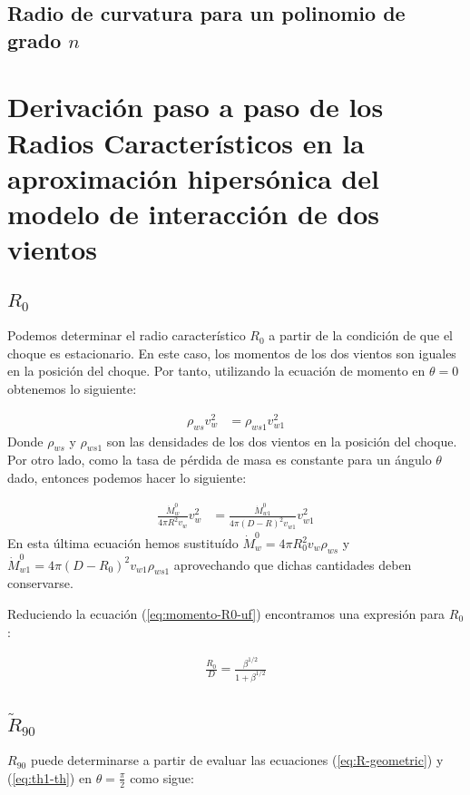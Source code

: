 \subsection{Radio de curvatura para un polinomio de grado $n$}
\label{app:curvature-radius-poly}

\section{Derivación paso a paso de los Radios Característicos en la aproximación
  hipersónica del modelo de interacción de dos vientos}
\label{app:dervation-radii}

\subsection{$R_0$}
Podemos determinar el radio característico $R_0$ a partir de la condición de que el choque es estacionario. En este caso,
los momentos de los dos vientos son iguales en la posición del choque. Por tanto, utilizando la ecuación de momento en $\theta=0$
obtenemos lo siguiente:

\begin{align}
  \rho_{ws} v^2_w &= \rho_{ws1} v^2_{w1}
\end{align}
Donde $\rho_{ws}$ y $\rho_{ws1}$ son las densidades de los dos vientos en la posición del choque. Por otro lado, como la tasa de pérdida
de masa es constante para un ángulo $\theta$ dado, entonces podemos hacer lo siguiente:

\begin{align}
  \frac{\dot{M}^0_w}{4\pi R^2 v_w}v^2_w &= \frac{\dot{M}^0_{w1}}{4\pi\left(D-R\right)^2v_{w1}}v^2_{w1} \label{eq:momento-R0-uf}
\end{align}
En esta última ecuación hemos sustituído $\dot{M}^0_w = 4\pi R_0^2 v_w \rho_{ws}$ y \\
$\dot{M}^0_{w1} = 4\pi \left(D - R_0\right)^2 v_{w1} \rho_{ws1}$ aprovechando que dichas cantidades deben conservarse.

Reduciendo la ecuación (\ref{eq:momento-R0-uf}) encontramos una expresión para $R_0$:

\begin{align}
  \frac{R_0}{D} = \frac{\beta^{1/2}}{1+\beta^{1/2}}
\end{align}

\subsection{$\tilde{R}_{90}$}
$R_{90}$ puede determinarse a partir de evaluar las ecuaciones (\ref{eq:R-geometric}) y (\ref{eq:th1-th}) en $\theta=\frac{\pi}{2}$
como sigue:

